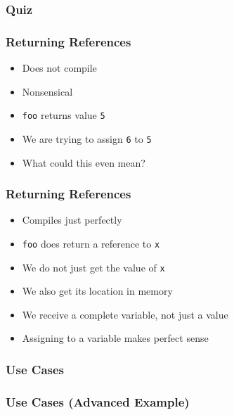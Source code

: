 \documentclass{../ucll-slides}
\begin{document}
\begin{frame}
  \frametitle{Quiz}
\end{frame}

\begin{frame}
  \frametitle{Returning References}
  \begin{itemize}
    \item Does not compile
    \item Nonsensical
    \item {\tt foo} returns value {\tt 5}
    \item We are trying to assign {\tt 6} to {\tt 5}
    \item What could this even mean?
  \end{itemize}
\end{frame}

\begin{frame}
  \frametitle{Returning References}
  \begin{itemize}
    \item Compiles just perfectly
    \item {\tt foo} does return a reference to {\tt x}
    \item We do not just get the value of {\tt x}
    \item We also get its location in memory
    \item We receive a complete variable, not just a value
    \item Assigning to a variable makes perfect sense
  \end{itemize}
\end{frame}

\begin{frame}
  \frametitle{Use Cases}
\end{frame}

\begin{frame}
  \frametitle{Use Cases (Advanced Example)}
\end{frame}
\end{document}
